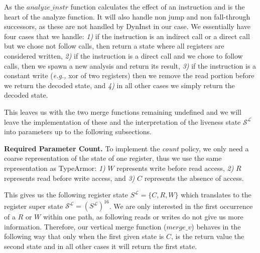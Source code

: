 As the $analyze\_instr$ function calculates the effect of an instruction and is the heart of the analyze function. It will also handle non jump 
and non fall-through successors, as these are not handled by DynInst in our case. We essentially have four cases that we handle:
\textit{1)} if the instruction is an indirect call or a direct call but we chose not follow calls, then return a state where all registers are considered written, 
\textit{2)} if the instruction is a direct call and we chose to follow calls, then we spawn a new analysis and return its result,
\textit{3)} if the instruction is a constant write (\textit{e.g.,} xor of two registers) then we remove the read portion before we return the decoded state, and 
\textit{4)} in all other cases we simply return the decoded state.

This leaves us with the two merge functions remaining undefined and we will leave the implementation of these and the interpretation of the  liveness state $\mathcal{S}^\mathcal{L}$ into parameters up to the following subsections.

\textbf{Required Parameter Count.}
\label{subsection:requiredparamcount}
To implement the \emph{count} policy, we only need a coarse representation of the state of one register, thus we use the same representation as TypeArmor:
\textit{1)} $W$ represents write before read access,
\textit{2)} $R$ represents read before write access, and
\textit{3)} $C$ represents the absence of access.

This gives us the following register state $S^\mathcal{L} = \{ C, R, W \}$ which translates to the register super state $\mathcal{S}^\mathcal{L} = (S^\mathcal{L})^{16}$.
We are only interested in the first occurrence of a $R$ or $W$ within one path, as following reads or writes do not give us more information. 
Therefore, our vertical merge function ($merge\_v$) behaves in the following way that only when the first given state is $C$, 
is the return value the second state and in all other cases it will return the first state.


